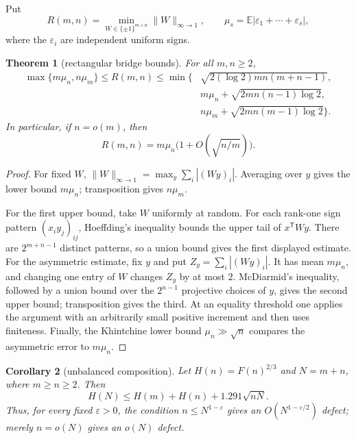 \documentclass[11pt]{article}
\newtheorem{theorem}{Theorem}[section]
\newtheorem{corollary}[theorem]{Corollary}
\theoremstyle{definition}
\theoremstyle{remark}
\newcommand{\E}{\mathbb E}
\begin{document}
Put
\[
 R(m,n)=\min_{W\in\{\pm1\}^{m\times n}}
 \|W\|_{\infty\to1},
 \qquad \mu_s=\E|\varepsilon_1+\cdots+\varepsilon_s|,
\]
where the $\varepsilon_i$ are independent uniform signs.

\begin{theorem}[rectangular bridge bounds]\label{thm:rectangular-bridge}
For all $m,n\ge2$,
\begin{align*}
 \max\{m\mu_n,n\mu_m\}\le R(m,n)
 \le\min\bigl\{&\sqrt{2(\log2)mn(m+n-1)},\\
 &m\mu_n+\sqrt{2mn(n-1)\log2},\\
 &n\mu_m+\sqrt{2mn(m-1)\log2}\bigr\}.
\end{align*}
In particular, if $n=o(m)$, then
\[
 R(m,n)=m\mu_n\bigl(1+O(\sqrt{n/m})\bigr).
\]
\end{theorem}

\begin{proof}
For fixed $W$,
$\|W\|_{\infty\to1}=\max_y\sum_i|(Wy)_i|$.  Averaging over
$y$ gives the lower bound $m\mu_n$; transposition gives $n\mu_m$.

For the first upper bound, take $W$ uniformly at random.  For each rank-one
sign pattern $(x_i y_j)_{ij}$, Hoeffding's inequality bounds the upper tail of
$x^{\mathsf T}Wy$.  There are $2^{m+n-1}$ distinct patterns, so a union bound
gives the first displayed estimate.  For the asymmetric estimate, fix $y$
and put $Z_y=\sum_i|(Wy)_i|$.  It has mean $m\mu_n$, and changing one entry
of $W$ changes $Z_y$ by at most $2$.  McDiarmid's inequality, followed by a
union bound over the $2^{n-1}$ projective choices of $y$, gives the second
upper bound; transposition gives the third.  At an equality threshold one
applies the argument with an arbitrarily small positive increment and then
uses finiteness.  Finally, the Khintchine lower bound
$\mu_n\gg\sqrt n$ compares the asymmetric error to $m\mu_n$.
\end{proof}

\begin{corollary}[unbalanced composition]\label{cor:unbalanced-composition}
Let $H(n)=F(n)^{2/3}$ and $N=m+n$, where $m\ge n\ge2$.  Then
\begin{equation}\label{eq:unbalanced-composition}
 H(N)\le H(m)+H(n)+1.291\sqrt{nN}.
\end{equation}
Thus, for every fixed $\varepsilon>0$, the condition
$n\le N^{1-\varepsilon}$ gives an $O(N^{1-\varepsilon/2})$ defect; merely
$n=o(N)$ gives an $o(N)$ defect.
\end{corollary}
\end{document}
